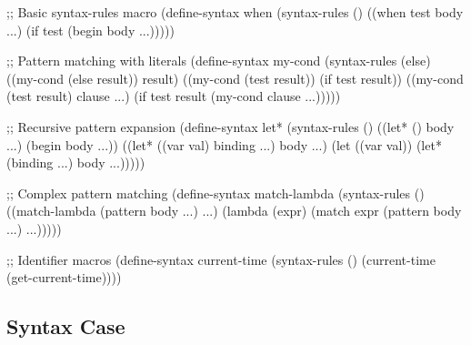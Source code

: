 \begin{example}
\begin{lambdustcode}
;; Basic syntax-rules macro
(define-syntax when
  (syntax-rules ()
    ((when test body ...)
     (if test (begin body ...)))))

;; Pattern matching with literals
(define-syntax my-cond
  (syntax-rules (else)
    ((my-cond (else result))
     result)
    ((my-cond (test result))
     (if test result))
    ((my-cond (test result) clause ...)
     (if test result (my-cond clause ...)))))

;; Recursive pattern expansion
(define-syntax let*
  (syntax-rules ()
    ((let* () body ...)
     (begin body ...))
    ((let* ((var val) binding ...) body ...)
     (let ((var val))
       (let* (binding ...) body ...)))))

;; Complex pattern matching
(define-syntax match-lambda
  (syntax-rules ()
    ((match-lambda (pattern body ...) ...)
     (lambda (expr)
       (match expr
         (pattern body ...) ...)))))

;; Identifier macros
(define-syntax current-time
  (syntax-rules ()
    (current-time (get-current-time))))
\end{lambdustcode}
\end{example}

\subsection{Syntax Case}
\label{subsec:syntax-case}

